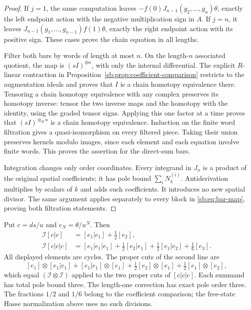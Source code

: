 \begin{proof}
If \(j=1\), the same computation leaves
\(-f(0)J_{n-1}(g_2,\ldots,g_n)\theta\), exactly the left
endpoint action with the negative multiplication sign in \(A\).
If \(j=n\), it leaves
\(J_{n-1}(g_1,\ldots,g_{n-1})f(1)\theta\), exactly the right
endpoint action with its positive sign.  These cases prove the chain
equation in all lengths.

Filter both bars by words of length at most \(n\).
On the length-\(n\) associated quotient, the map is
\((sI)^{\otimes n}\), with only the internal differential.
The explicit \(R\)-linear contraction in Proposition~\ref{sb:prop:coefficient-comparison}
restricts to the augmentation ideals and proves that \(I\) is a
chain homotopy equivalence there.  Tensoring a chain homotopy
equivalence with any complex preserves its homotopy inverse: tensor
the two inverse maps and the homotopy with the identity, using the
graded tensor signs.  Applying this one factor at a time proves
that \((sI)^{\otimes_R n}\) is a chain homotopy equivalence.
Induction on the finite word filtration gives a quasi-isomorphism
on every filtered piece.  Taking their union preserves kernels modulo
images, since each element and each equation involve finite words.
This proves the assertion for the direct-sum bars.

Integration changes only order coordinates.  Every integrand in
\(J_n\) is a product of the original spatial coefficients; it has
pole bound \(\sum_iN^{(i)}_\delta\).  Antiderivation multiplies
by scalars of \(k\) and adds such coefficients.  It introduces no
new spatial divisor.  The same argument applies separately to every
block in \eqref{sb:eq:bar-map}, proving both filtration statements.
\end{proof}

\begin{example}\label{sb:ex:three-pole-bar}
Put \(c=ds/u\) and \(e_N=\theta/u^N\).  Then
\[
 \begin{aligned}
 \mathcal I[c|c]&=[e_1|e_1]+\tfrac12[e_2],\\
 \mathcal I[c|c|c]&=[e_1|e_1|e_1]
    +\tfrac12[e_2|e_1]+\tfrac12[e_1|e_2]+\tfrac16[e_3].
 \end{aligned}
\]
All displayed elements are cycles.  The proper cuts of the second
line are
\[
 [e_1]\otimes[e_1|e_1]
 +[e_1|e_1]\otimes[e_1]
 +\tfrac12[e_2]\otimes[e_1]
 +\tfrac12[e_1]\otimes[e_2],
\]
which equal \((\mathcal I\otimes\mathcal I)\) applied to the
two proper cuts of \([c|c|c]\).  Each summand has total pole
bound three.  The length-one correction has exact pole order three.
The fractions \(1/2\) and \(1/6\) belong to the coefficient
comparison; the free-state Hasse normalization above uses no such divisions.
\end{example}


